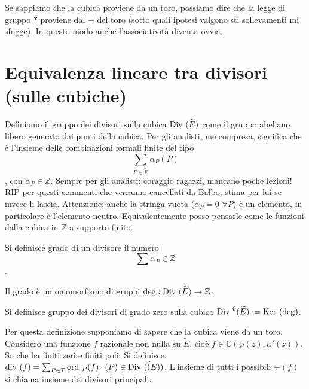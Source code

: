 \begin{osservazione}
Se sappiamo che la cubica proviene da un toro, possiamo dire che la legge di gruppo $*$ proviene dal $+$ del toro (sotto quali ipotesi valgono sti sollevamenti mi sfugge). In questo modo anche l'associatività diventa ovvia.
\end{osservazione}

\section{Equivalenza lineare tra divisori (sulle cubiche)}

\begin{definizione}
Definiamo il gruppo dei divisori sulla cubica $\mbox{Div }(\widetilde{E})$ come il gruppo abeliano libero generato dai punti della cubica. Per gli analisti, me compresa, significa che è l'insieme delle combinazioni formali finite del tipo $$\sum_{P \in \widetilde{E}} \alpha_P(P)$$,
con $\alpha_P \in \mathbb{Z}$.
Sempre per gli analisti: coraggio ragazzi, mancano poche lezioni!
RIP per questi commenti che verranno cancellati da Balbo, stima per lui se invece li lascia.
Attenzione: anche la stringa vuota ($\alpha_P=0$ $\forall P$) è un elemento, in particolare è l'elemento neutro.
Equivalentemente posso pensarle come le funzioni dalla cubica in $\mathbb{Z}$ a supporto finito.
\end{definizione}

\begin{definizione}
Si definisce grado di un divisore il numero $$\sum \alpha_P \in \mathbb{Z}$$.
\end{definizione} 

\begin{osservazione}Il grado è un omomorfismo di gruppi $\deg: \mbox{Div }(\widetilde{E}) \rightarrow \mathbb{Z}$.
\end{osservazione}


\begin{definizione}
Si definisce gruppo dei divisori di grado zero sulla cubica $\mbox{Div }^0(\widetilde{E}) := \mbox{Ker }(\deg)$.
\end{definizione}

\begin{definizione}
Per questa definizione supponiamo di sapere che la cubica viene da un toro.
Considero una funzione $f$ razionale non nulla su $\widetilde{E}$, cioè $f \in \mathbb{C}(\wp(z),\wp'(z))$. So che ha finiti zeri e finiti poli.
Si definisce: $\mbox{div }(f) = \sum_{P\in T} \mbox{ord }_P(f) \cdot (P) \in \mbox{Div }(\widetilde(E))$.
L'insieme di tutti i possibili $\div(f)$ si chiama insieme dei divisori principali.
\end{definizione}

